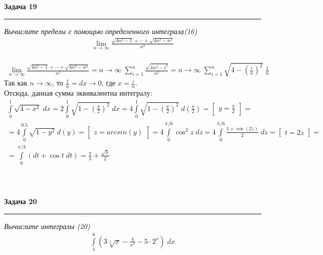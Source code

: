 \documentclass[a4paper,11pt]{article}
\begin{document}


\textbf{\large Задача 19}
\medskip\hrule\medskip
\textit{Вычислите пределы с помощью определенного интеграла(16)}
\begin{align*}
\lim\limits_{n \to \infty} \frac{\sqrt{4n^2 - 1} + \cdots + \sqrt{4n^2 - n^2}}{n^2}
\end{align*} \\[2pt]

\begin{gather*}
\lim\limits_{n \to \infty} \frac{\sqrt{4n^2 - 1} + \cdots + \sqrt{4n^2 - n^2}}{n^2} = 
n \to \infty \; \sum\limits_{i = 1}^{n} \frac{\sqrt{4n^2 - i^2}}{n^2} = n \to \infty \; \sum\limits_{i = 1}^{n} \sqrt{4 - (\frac{i}{n})^2} \; \frac1{n}
\end{gather*}
Так как $ n \to \infty $, то $ \frac1{n} = dx \to 0 $, где $ x = \frac{i}{n} $. \\[2pt] Отсюда, данная сумма эквивалентна интегралу:
\begin{gather*}
\int\limits_{0}^{1} \sqrt{4 - x^2} \; dx 
= 2 \int\limits_{0}^{1} \sqrt{1 - (\frac{x}{2})^2} \; dx  
= 4 \int\limits_{0}^{1} \sqrt{1 - (\frac{x}{2})^2} \; d(\frac{x}2) 
= \begin{bmatrix} y = \frac{x}2 \end{bmatrix} = \\[2pt]
= 4\int\limits_{0}^{0.5} \sqrt{1 - y^2} \; d(y) 
= \begin{bmatrix} z = arcsin(y) \end{bmatrix} 
= 4\int\limits_{0}^{\pi / 6} \cos^2 z \; dz 
= 4\int\limits_{0}^{\pi / 6} \frac{1 + \cos (2z)}2 \; dz 
= \begin{bmatrix} t = 2z \end{bmatrix} = \\[2pt]
= \int\limits_{0}^{\pi / 3} (dt + \cos t \; dt) = \frac{\pi}3 + \frac{\sqrt{3}}2
\end{gather*}
\\ \\ \\






\textbf{\large Задача 20}
\medskip\hrule\medskip
\textit{Вычислите интегралы (20)}
\begin{align*}
\int\limits_1^6 (3 \sqrt[3]{x} - \frac{4}{x^2} - 5 \cdot 2^x) \; dx
\end{align*}
\end{document}
